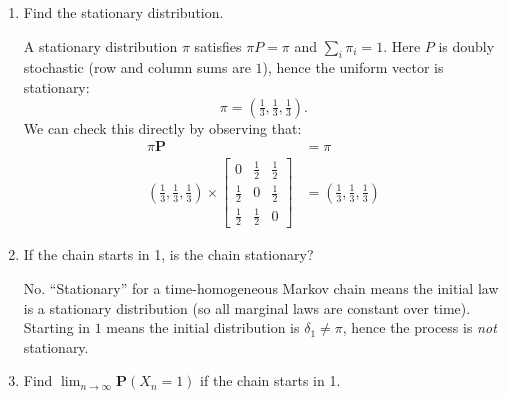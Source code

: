 \documentclass[dvipsnames,11pt]{article}
\begin{document}
\begin{enumerate}[label=\alph*.]
\begin{solution}
            \end{solution}

        \item Find the stationary distribution.

            \begin{solution}

                A stationary distribution $\pi$ satisfies $\pi P=\pi$ and $\sum_i\pi_i=1$. Here $P$ is doubly stochastic (row and column sums are $1$), hence the uniform vector is stationary:
                \[
                \pi=\left(\tfrac13,\tfrac13,\tfrac13\right).
                \]
                We can check this directly by observing that:
                \begin{align}
                    \pi \mathbf{P} &=\pi \\
                    \left(\frac{1}{3},\frac{1}{3},\frac{1}{3}\right) \times \left[
                    \begin{array}{ccc}
                    0 & \tfrac12 & \tfrac12 \\
                    \tfrac12 & 0 & \tfrac12 \\
                    \tfrac12 & \tfrac12 & 0
                    \end{array}
                    \right] & = \left(\frac{1}{3},\frac{1}{3},\frac{1}{3}\right)
                \end{align}
                
            \end{solution}
            
        \item If the chain starts in 1, is the chain stationary?
    
            \begin{solution}
    
                No. “Stationary” for a time-homogeneous Markov chain means the initial law is a stationary distribution (so all marginal laws are constant over time). Starting in $1$ means the initial distribution is $\delta_1\neq \pi$, hence the process is \emph{not} stationary.
                
            \end{solution}
            
        \item Find $\lim_{n\rightarrow\infty}\mathbf{P}(X_n= 1)$ if the chain starts in 1.
    
            \begin{solution}


\end{solution}
\end{enumerate}
\end{document}
